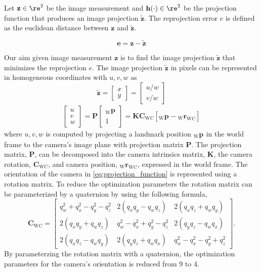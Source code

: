 \documentclass{article}
\renewcommand{\Vec}[1]{{\mathbf{#1}}}
\newcommand{\Mat}[1]{{\mathbf{#1}}}
\newcommand{\cam}{{\text{C}}}
\newcommand{\world}{{\text{W}}}
\newcommand{\KineNotationTransform}[3]{{{#1}_{#2#3}}}
\newcommand{\KineNotation}[3]{{{{}_{#2}} {#1}_{#2#3}}}
\newcommand{\KineNotationPart}[3]{{{{}_{#2}} {#1}_{#3}}}
\newcommand{\pos}{{\Vec{r}}}
\newcommand{\Pos}[2]{{\KineNotation{\pos}{#1}{#2}}}
\newcommand{\rot}{{\Mat{C}}}
\newcommand{\Rot}[2]{{\KineNotationTransform{\rot}{#1}{#2}}}
\newcommand{\point}{\Vec{p}}
\newcommand{\Pt}[1]{{\KineNotationPart{\point}{#1}{}}}
\newcommand{\error}{{\Vec{e}}}
\newcommand{\camRot}{{\Rot{\world}{\cam}}}
\newcommand{\camPos}{{\Pos{\world}{\cam}}}
\newcommand{\projFunc}{{\Vec{h}}}
\newcommand{\measurement}{{\Vec{z}}}
\newcommand{\estimate}{{\tilde{\Vec{z}}}}
\begin{document}
Let $\measurement \in \re^{2}$ be the image measurement and $\projFunc(\cdot)
\in \re^{2}$ be the projection function that produces an image projection
$\estimate$. The reprojection error $e$ is defined as the euclidean distance
between $\measurement$ and $\estimate$.

\begin{equation}
  \error = \measurement - \estimate
\end{equation}

Our aim given image measurement $\measurement$ is to find the image projection
$\estimate$ that minimizes the reprojection $e$. The image projection
$\estimate$ in pixels can be represented in homogeneous coordinates with
$u, v, w$ as
%
\begin{equation}
  \estimate
  = \begin{bmatrix} x \\ y \end{bmatrix}
  = \begin{bmatrix} u / w \\ v / w \end{bmatrix}
\end{equation}
%
\begin{align}
  \label{eq:projection_function}
  \begin{bmatrix} u \\ v \\ w \end{bmatrix}
    = \Mat{P} \begin{bmatrix} \Pt{\world} \\ 1 \end{bmatrix}
      = \Mat{K} \camRot [\Pt{\world} - \camPos]
\end{align}
%
where $u, v, w$ is computed by projecting a landmark position $\Pt{\world}$ in
the world frame to the camera's image plane with projection matrix $\Mat{P}$.
The projection matrix, $\Mat{P}$, can be decomposed into the camera intrinsics
matrix, $\Mat{K}$, the camera rotation, $\camRot$, and camera position,
$\camPos$, expressed in the world frame.
%
The orientation of the camera in \eqref{eq:projection_function} is
represented using a rotation matrix. To reduce the optimization parameters
the rotation matrix can be parameterized by a quaternion by using the following
formula,
%
\begin{equation}
  \camRot = \begin{bmatrix}
    q_{w}^{2} + q_{x}^{2} - q_{y}^{2} - q_{z}^{2}
    & 2 (q_{x} q_{y} - q_{w} q_{z})
    & 2 (q_{x} q_{z} + q_{w} q_{y}) \\
    2 (q_{x} q_{y} + q_{w} q_{z})
    & q_{w}^{2} - q_{x}^{2} + q_{y}^{2} - q_{z}^{2}
    & 2 (q_{y} q_{z} - q_{w} q_{x}) \\
    2 (q_{x} q_{z} - q_{w} q_{y})
    & 2 (q_{y} q_{z} + q_{w} q_{x})
    & q_{w}^{2} - q_{x}^{2} - q_{y}^{2} + q_{z}^{2}
  \end{bmatrix}.
\end{equation}
%
By parameterzing the rotation matrix with a quaternion, the optimization
parameters for the camera's orientation is reduced from 9 to 4.
\end{document}
